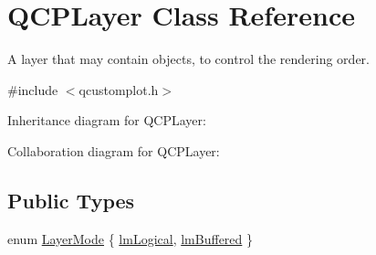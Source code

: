 \hypertarget{class_q_c_p_layer}{}\section{Q\+C\+P\+Layer Class Reference}
\label{class_q_c_p_layer}


A layer that may contain objects, to control the rendering order.  




{\ttfamily \#include $<$qcustomplot.\+h$>$}



Inheritance diagram for Q\+C\+P\+Layer\+:


Collaboration diagram for Q\+C\+P\+Layer\+:
\subsection*{Public Types}
\begin{DoxyCompactItemize}
\item 
enum \hyperlink{class_q_c_p_layer_a67dcfc1590be2a1f2227c5a39bb59c7c}{Layer\+Mode} \{ \hyperlink{class_q_c_p_layer_a67dcfc1590be2a1f2227c5a39bb59c7ca02eb5e9a4cb7f1baf1e2b6b99e3b87ce}{lm\+Logical}, 
\hyperlink{class_q_c_p_layer_a67dcfc1590be2a1f2227c5a39bb59c7cab581b9fab3007c4c65f057f4185d7538}{lm\+Buffered}
 \}
\end{DoxyCompactItemize}
